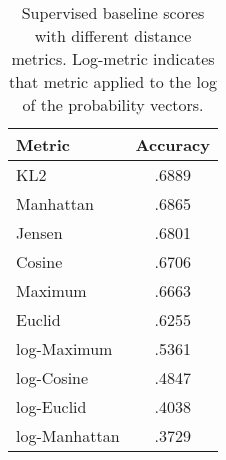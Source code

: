 \begin{table}[h] \centering
\caption{Supervised baseline scores with different distance metrics.
  Log-metric indicates that metric applied to the log of the
  probability vectors.}
\begin{tabular}{|l|c|}
\hline
Metric & Accuracy \\
\hline
KL2 & .6889 \\
Manhattan & .6865 \\
Jensen & .6801 \\
Cosine & .6706 \\
Maximum & .6663 \\
Euclid & .6255 \\
log-Maximum & .5361 \\
log-Cosine & .4847 \\
log-Euclid & .4038 \\
log-Manhattan & .3729 \\
\hline
\end{tabular}
\label{tab:distscores}
\end{table}

